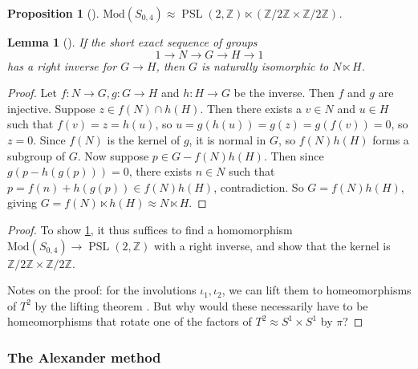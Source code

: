\documentclass[reqno]{amsart}
\newtheorem{lemma}[theorem]{Lemma}
\newtheorem{proposition}[theorem]{Proposition}
\theoremstyle{definition}
\theoremstyle{remark}
\DeclareMathOperator{\PSL}{PSL}
\newcommand{\Mod}{{\mathrm{Mod}}}
\begin{document}
\begin{proposition}[]\label{mcg-of-4-punctured-sphere}
    $\Mod \left( S_{0,4} \right) \approx
    \PSL \left( 2, \mathbb{Z} \right) \ltimes
    \left( \mathbb{Z}/ 2 \mathbb{Z} \times 
    \mathbb{Z} / 2 \mathbb{Z} \right) $.
\end{proposition}


\begin{lemma}[]
    If the short exact sequence of groups
    \[
    1 \to N \to G \to H \to 1
    \] 
    has a right inverse for $G \to H$, then
    $G$ is naturally isomorphic to
    $N \ltimes H$.
\end{lemma}

\begin{proof}
    Let $f \colon N \to G, g \colon G \to H$ and
    $h \colon H \to G$ be the inverse. Then
    $f$ and $g$ are injective. Suppose
    $z \in f(N) \cap h(H)$. Then there exists a
    $v \in N$ and $u \in H$ such that
    $f(v) = z = h(u)$, so 
    $u = g\left( h(u) \right) = g(z)
    = g(f(v)) = 0$, so $z = 0$.
    Since $f(N)$ is the kernel of $g$, it is
    normal in $G$, so $f(N) h(H)$ forms
    a subgroup of $G$. Now suppose
    $p \in G - f(N)h(H)$. Then since
    $g\left( p - h(g(p)) \right) = 0$, there
    exists $n \in N$ such that
    $p = f(n) + h(g(p)) \in f(N) h(H)$, contradiction.
    So $G = f(N) h(H)$, giving $G = f(N) \ltimes h(H)
    \approx N \ltimes H$.
\end{proof}

\begin{proof}
    To show \ref{mcg-of-4-punctured-sphere}, it
    thus suffices to find a homomorphism
    $\Mod \left( S_{0,4} \right) \to 
    \PSL \left( 2, \mathbb{Z} \right) $ with a right
    inverse, and show that the kernel
    is $\mathbb{Z} /2 \mathbb{Z} \times \mathbb{Z} / 2 \mathbb{Z}$.

    Notes on the proof: for the involutions
    $\iota_1, \iota_2$, we can lift them
    to homeomorphisms of $T^2$ by the lifting theorem
    \cite[Thm~4.1]{Bredon}. But why would these
    necessarily have to be homeomorphisms that rotate
    one of the factors of $T^2 \approx S^{1} \times S^{1}$ by
    $\pi$?
\end{proof}


\subsubsection{The Alexander method}
\end{document}
